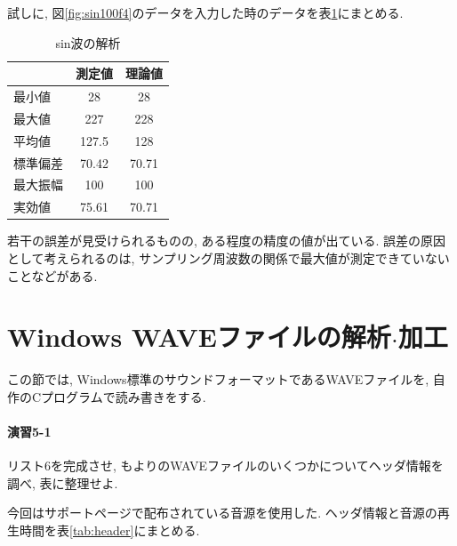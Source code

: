 \documentclass[titlepage]{jsarticle}
\begin{document}
        試しに, 図\ref{fig:sin100f4}のデータを入力した時のデータを表\ref{tab:stat}にまとめる.

        \begin{table}[ht]
            \centering
            \caption{sin波の解析}
            \label{tab:stat}
            \begin{tabular}{l||c|c} \hline
                & 測定値 & 理論値 \\ \hline
                最小値 & 28 & 28 \\
                最大値 & 227 & 228 \\
                平均値 & 127.5 & 128 \\
                標準偏差 & 70.42 & 70.71 \\
                最大振幅 & 100 & 100 \\
                実効値 & 75.61 & 70.71 \\ \hline
            \end{tabular}
        \end{table}

        若干の誤差が見受けられるものの, ある程度の精度の値が出ている.
        誤差の原因として考えられるのは, サンプリング周波数の関係で最大値が測定できていないことなどがある.

\section{Windows WAVEファイルの解析$\cdot$加工}
    この節では, Windows標準のサウンドフォーマットであるWAVEファイルを,
    自作のCプログラムで読み書きをする.

    \paragraph{演習5-1} リスト6を完成させ, もよりのWAVEファイルのいくつかについてヘッダ情報を調べ,
    表に整理せよ.

        今回はサポートページ\cite{Support Page}で配布されている音源を使用した.
        ヘッダ情報と音源の再生時間を表\ref{tab:header}にまとめる.
\end{document}

